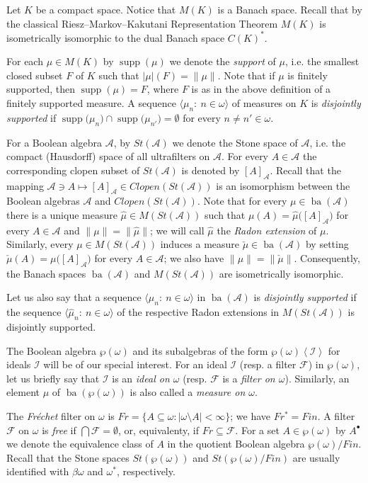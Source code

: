 \documentclass[a4paper,11pt,fleqn]{amsart}
\theoremstyle{definition}
\theoremstyle{remark}
\numberwithin{equation}{section}
\newcommand{\N}{\mathbb{N}}
\newcommand{\aA}{\mathcal{A}}
\newcommand{\fF}{\mathcal{F}}
\newcommand{\iI}{\mathcal{I}}
\DeclareMathOperator{\ba}{ba}
\newcommand{\sm}{\setminus}
\newcommand{\sub}{\subseteq}
\DeclareMathOperator{\supp}{supp}
\newcommand{\wh}{\widehat}
\newcommand{\seqn}[1]{\big\langle#1\colon\ n\io\big\rangle}
\newcommand{\gen}[1]{\mathopen{}\left\langle#1\mathclose{}\right\rangle}
\newcommand{\clopen}[1]{\left[#1\right]}
\newcommand{\io}{\in\omega}%
\newcommand{\wo}{{\wp(\omega)}}%
\newcommand{\bo}{{\beta\omega}}%
\begin{document}
Let $K$ be a compact space. Notice that $M(K)$ is a Banach space. Recall that by the classical Riesz--Markov--Kakutani Representation Theorem $M(K)$ is isometrically isomorphic to the dual Banach space $C(K)^*$. 

For each $\mu\in M(K)$ by $\supp(\mu)$ we denote the \textit{support} of $\mu$, i.e. the smallest closed subset $F$ of $K$ such that $|\mu|(F)=\|\mu\|$. Note that if $\mu$ is finitely supported, then $\supp(\mu)=F$, where $F$ is as in the above definition of a finitely supported measure. A sequence $\seqn{\mu_n}$ of measures on $K$ is \textit{disjointly supported} if $\supp\big(\mu_n\big)\cap\supp\big(\mu_{n'}\big)=\emptyset$ for every $n\neq n'\io$.

For a Boolean algebra $\aA$, by $St(\aA)$ we denote the Stone space of $\aA$, i.e. the compact (Hausdorff) space of all ultrafilters on $\aA$. For every $A\in\aA$ the corresponding clopen subset of $St(\aA)$ is denoted by $\clopen{A}_\aA$. Recall that the mapping $\aA\ni A\mapsto\clopen{A}_\aA\in Clopen(St(\aA))$ is an isomorphism between the Boolean algebras $\aA$ and $Clopen(St(\aA))$. Note that for every $\mu\in\ba(\aA)$ there is a unique measure $\wh{\mu}\in M(St(\aA))$ such that $\mu(A)=\wh{\mu}\big(\clopen{A}_\aA\big)$ for every $A\in\aA$ and $\|\mu\|=\|\wh{\mu}\|$; we will call $\wh{\mu}$ the \textit{Radon extension} of $\mu$. Similarly, every $\mu\in M(St(\aA))$ induces a measure $\check{\mu}\in\ba(\aA)$ by setting $\check{\mu}(A)=\mu\big(\clopen{A}_\aA\big)$ for every $A\in\aA$; we also have $\|\mu\|=\|\check{\mu}\|$. Consequently, the Banach spaces $\ba(\aA)$ and $M(St(\aA))$ are isometrically isomorphic.

Let us also say that a sequence $\seqn{\mu_n}$ in $\ba(\aA)$ is \textit{disjointly supported} if the sequence $\seqn{\wh{\mu}_n}$ of the respective Radon extensions in $M(St(\aA))$ is disjointly supported.

\medskip

The Boolean algebra $\wo$ and its subalgebras of the form $\wo\gen{\iI}$ for ideals $\iI$ will be of our special interest. For an ideal $\iI$ (resp. a filter $\fF$) in $\wo$, let us briefly say that $\iI$ is an \textit{ideal on $\omega$} (resp. $\fF$ is a \textit{filter on $\omega$}). Similarly, an element $\mu$ of $\ba(\wo)$ is also called a \textit{measure on $\omega$}.

The \textit{Fr\'echet} filter on $\omega$ is $Fr=\{A\sub\omega\colon |\omega\sm A|<\infty\}$; we have $Fr^*=Fin$. A filter $\fF$ on $\omega$ is \textit{free} if $\bigcap\fF=\emptyset$, or, equivalenty, if $Fr\sub\fF$. For a set $A\in\wo$ by $A^\bullet$ we denote the equivalence class of $A$ in the quotient Boolean algebra $\wo/Fin$. Recall that the Stone spaces $St(\wo)$ and $St(\wo/Fin)$ are usually identified with $\bo$ and $\omega^*$, respectively.
\end{document}
